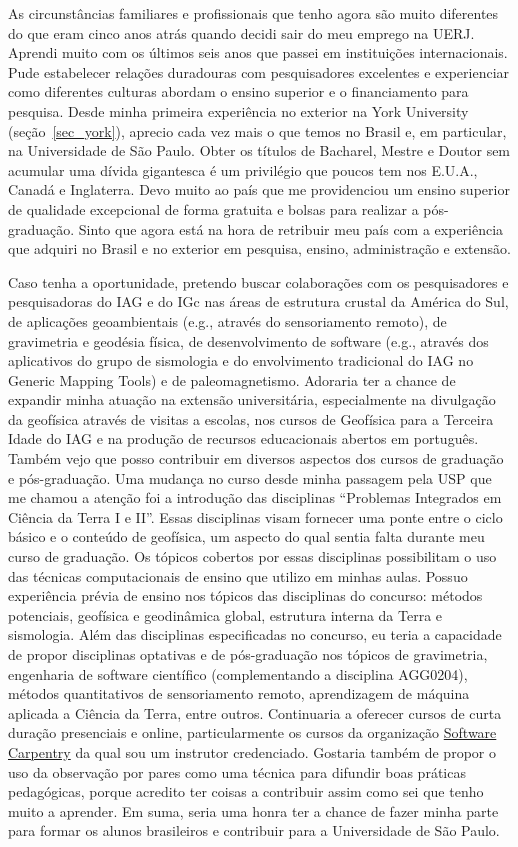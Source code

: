 \documentclass[10pt,a4paper,oneside]{book}
\begin{document}
As circunstâncias familiares e profissionais que tenho agora são muito
diferentes do que eram cinco anos atrás quando decidi sair do meu emprego na
UERJ.
Aprendi muito com os últimos seis anos que passei em instituições
internacionais.
Pude estabelecer relações duradouras com pesquisadores excelentes e
experienciar como diferentes culturas abordam o ensino superior e o
financiamento para pesquisa.
Desde minha primeira experiência no exterior na York University
(seção~\ref{sec_york}), aprecio cada vez mais o que temos no Brasil e, em
particular, na Universidade de São Paulo.
Obter os títulos de Bacharel, Mestre e Doutor sem acumular uma dívida
gigantesca é um privilégio que poucos tem nos E.U.A., Canadá e Inglaterra.
Devo muito ao país que me providenciou um ensino superior de qualidade
excepcional de forma gratuita e bolsas para realizar a pós-graduação.
Sinto que agora está na hora de retribuir meu país com a experiência que
adquiri no Brasil e no exterior em pesquisa, ensino, administração e extensão.

Caso tenha a oportunidade, pretendo buscar colaborações com os pesquisadores e
pesquisadoras do IAG e do IGc nas áreas de estrutura crustal da América do Sul,
de aplicações geoambientais (e.g., através do sensoriamento remoto), de
gravimetria e geodésia física, de desenvolvimento de software (e.g., através
dos aplicativos do grupo de sismologia e do envolvimento tradicional do IAG no
Generic Mapping Tools) e de paleomagnetismo.
Adoraria ter a chance de expandir minha atuação na extensão universitária,
especialmente na divulgação da geofísica através de visitas a escolas, nos
cursos de Geofísica para a Terceira Idade do IAG e na produção de recursos
educacionais abertos em português.
Também vejo que posso contribuir em diversos aspectos dos cursos de graduação
e pós-graduação.
Uma mudança no curso desde minha passagem pela USP que me chamou a atenção foi
a introdução das disciplinas ``Problemas Integrados em Ciência da Terra I e
II''.
Essas disciplinas visam fornecer uma ponte entre o ciclo básico e o conteúdo de
geofísica, um aspecto do qual sentia falta durante meu curso de graduação.
Os tópicos cobertos por essas disciplinas possibilitam o uso das técnicas
computacionais de ensino que utilizo em minhas aulas.
Possuo experiência prévia de ensino nos tópicos das disciplinas do concurso:
métodos potenciais, geofísica e geodinâmica global, estrutura interna da Terra
e sismologia.
Além das disciplinas especificadas no concurso, eu teria a capacidade de
propor disciplinas optativas e de pós-graduação nos tópicos de gravimetria,
engenharia de software científico (complementando a disciplina AGG0204),
métodos quantitativos de sensoriamento remoto, aprendizagem de máquina aplicada
a Ciência da Terra, entre outros.
Continuaria a oferecer cursos de curta duração presenciais e online,
particularmente os cursos da organização
\href{https://softwareunderground.org/}{Software Carpentry} da qual sou um
instrutor credenciado.
Gostaria também de propor o uso da observação por pares como uma técnica para
difundir boas práticas pedagógicas, porque acredito ter coisas a
contribuir assim como sei que tenho muito a aprender.
Em suma, seria uma honra ter a chance de fazer minha parte para formar os
alunos brasileiros e contribuir para a Universidade de São Paulo.


\backmatter


\end{document}
